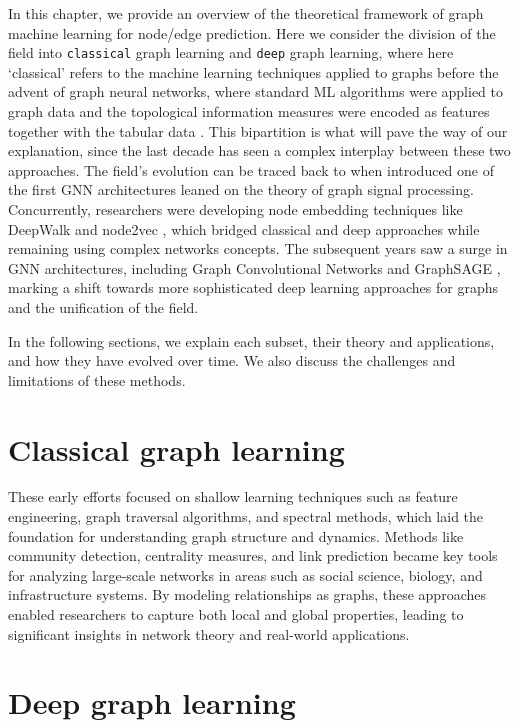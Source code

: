 In this chapter, we provide an overview of the theoretical framework of graph machine learning for node/edge prediction. Here we consider the division of the field into \texttt{classical} graph learning and \texttt{deep} graph learning, where here `classical' refers to the machine learning techniques applied to graphs before the advent of graph neural networks, where standard ML algorithms were applied to graph data and the topological information measures were encoded as features together with the tabular data  \cite{costa2007characterization, silva2016machine}. This bipartition is what will pave the way of our explanation, since the last decade has seen a complex interplay between these two approaches. The field's evolution can be traced back to when  introduced one of the first GNN architectures leaned on the theory of graph signal processing. Concurrently, researchers were developing node embedding techniques like DeepWalk \cite{perozzi2014deepwalk} and node2vec \cite{grover2016node2vec}, which bridged classical and deep approaches while remaining using complex networks concepts. The subsequent years saw a surge in GNN architectures, including Graph Convolutional Networks \cite{kipf2016semi} and GraphSAGE \cite{hamilton2017inductive}, marking a shift towards more sophisticated deep learning approaches for graphs and the unification of the field.  

In the following sections, we explain each subset, their theory and applications, and how they have evolved over time. We also discuss the challenges and limitations of these methods.

\section{Classical graph learning}



These early efforts focused on shallow learning techniques such as feature engineering, graph traversal algorithms, and spectral methods, which laid the foundation for understanding graph structure and dynamics. Methods like community detection, centrality measures, and link prediction became key tools for analyzing large-scale networks in areas such as social science, biology, and infrastructure systems. By modeling relationships as graphs, these approaches enabled researchers to capture both local and global properties, leading to significant insights in network theory and real-world applications.

\section{Deep graph learning}

